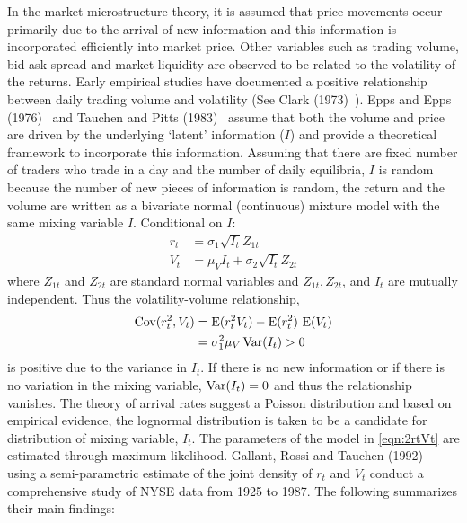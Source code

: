 In the market microstructure theory, it is assumed that price movements occur primarily due to the arrival of new information and this information is incorporated efficiently into market price. Other variables such as trading volume, bid-ask spread and market liquidity are observed to be related to the volatility of the returns. Early empirical studies have documented a positive relationship between daily trading volume and volatility (See Clark (1973)~\cite{clark}). Epps and Epps (1976)~\cite{epps} and Tauchen and Pitts (1983)~\cite{tauchenpitts} assume that both the volume and price are driven by the underlying `latent' information ($I$) and provide a theoretical framework to incorporate this information. Assuming that there are fixed number of traders who trade in a day and the number of daily equilibria, $I$ is random because the number of new pieces of information is random, the return and the volume are written as a bivariate normal (continuous) mixture model with the same mixing variable $I$. Conditional on $I$:
	\begin{equation} \label{eqn:2rtVt}
	\begin{aligned}
	 r_t&= \sigma_1 \sqrt{I_t}Z_{1t} \\
	 V_t&= \mu_VI_t + \sigma_2 \sqrt{I_t}Z_{2t}
	 \end{aligned}
	 \end{equation}
where $Z_{1t}$ and $Z_{2t}$ are standard normal variables and $Z_{1t},  Z_{2t}$, and $I_t$ are mutually independent. Thus the volatility-volume relationship,
	\begin{equation} \label{eqn:2covVt}
	\begin{aligned}
	\cov(r_t^2,V_t)& = \Ex(r_{t}^2V_t) - \Ex(r_t^2) \,\Ex(V_t) \\ 
	&= \sigma_1^2 \mu_V \var(I_t) > 0
	\end{aligned}
	\end{equation}
is positive due to the variance in $I_t$. If there is no new information or if there is no variation in the mixing variable, $\operatorname{Var}(I_t)= 0$ and thus the relationship vanishes. The theory of arrival rates suggest a
Poisson distribution\label{in:poisson} and based on empirical evidence, the lognormal distribution is taken to be a candidate for distribution of mixing variable, $I_t$. The parameters of the model in \eqref{eqn:2rtVt} are estimated through maximum likelihood. Gallant, Rossi and Tauchen (1992)~\cite{grt} using a semi-parametric estimate of the joint density of $r_t$ and $V_t$ conduct a comprehensive study of NYSE data from 1925 to 1987. The following summarizes their main findings: \twomedskip


